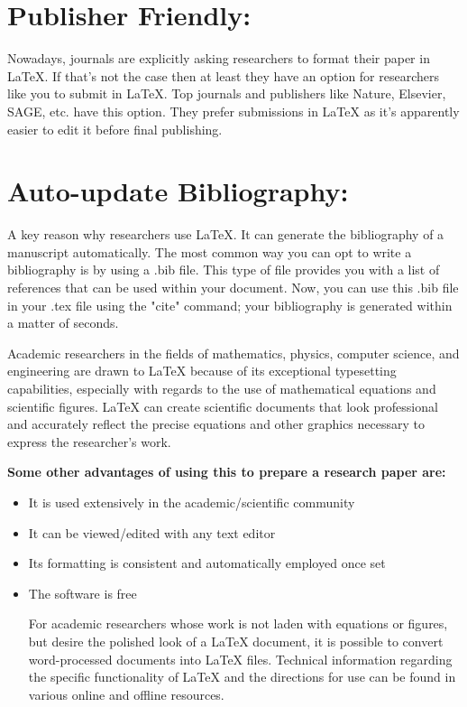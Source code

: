 \documentclass[12pt, document]{article}
\begin{document}
\chapter{\textbf{Publisher Friendly:}}
Nowadays, journals are explicitly asking researchers to format their paper in LaTeX. If that’s not the case then at least they have an option for researchers like you to submit in LaTeX. Top journals and publishers like Nature, Elsevier, SAGE, etc. have this option. They prefer submissions in LaTeX as it’s apparently easier to edit it before final publishing.

\chapter{\textbf{Auto-update Bibliography:}}
A key reason why researchers use LaTeX. It can generate the bibliography of a manuscript automatically. The most common way you can opt to write a bibliography is by using a .bib file. This type of file provides you with a list of references that can be used within your document. Now, you can use this .bib file in your .tex file using the "cite{}" command; your bibliography is generated within a matter of seconds.
\thispagestyle{empty}

\pagebreak



Academic researchers in the fields of mathematics, physics, computer science, and engineering are drawn to LaTeX because of its exceptional typesetting capabilities, especially with regards to the use of mathematical equations and scientific figures. LaTeX can create scientific documents that look professional and accurately reflect the precise equations and other graphics necessary to express the researcher’s work.

\textbf{Some other advantages of using this to prepare a research paper are:}

\begin{itemize}

\item It is used extensively in the academic/scientific community
\item It can be viewed/edited with any text editor
\item Its formatting is consistent and automatically employed once set
\item The software is free
\vspace{1cm}

For academic researchers whose work is not laden with equations or figures, but desire the polished look of a LaTeX document, it is possible to convert word-processed documents into LaTeX files. Technical information regarding the specific functionality of LaTeX and the directions for use can be found in various online and offline resources.

\end{itemize}
\thispagestyle{empty}
\end{document}
